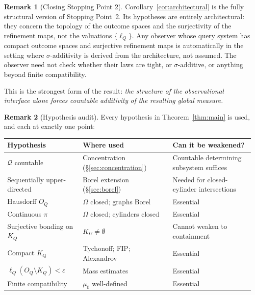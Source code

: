 \documentclass[11pt]{article}
\theoremstyle{definition}
\newtheorem{remark}{Remark}
\newcommand{\Qcal}{\mathcal{Q}}
\begin{document}
\begin{remark}[Closing Stopping Point 2]
Corollary~\ref{cor:architectural} is the fully structural version
of Stopping Point~2.  Its hypotheses are entirely architectural:
they concern the topology of the outcome spaces and the surjectivity
of the refinement maps, not the valuations $\{\ell_Q\}$.  Any
observer whose query system has compact outcome spaces and surjective
refinement maps is automatically in the setting where
$\sigma$-additivity is derived from the architecture, not assumed.
The observer need not check whether their laws are tight, or
$\sigma$-additive, or anything beyond finite compatibility.

This is the strongest form of the result: \emph{the structure of
the observational interface alone forces countable additivity of the
resulting global measure.}
\end{remark}

\begin{remark}[Hypothesis audit]
Every hypothesis in Theorem~\ref{thm:main} is used, and each
at exactly one point:

\begin{center}
\begin{tabular}{lll}
\toprule
Hypothesis & Where used & Can it be weakened? \\
\midrule
$\Qcal$ countable & Concentration (\S\ref{sec:concentration})
  & Countable determining subsystem suffices \\
Sequentially upper-directed & Borel extension (\S\ref{sec:borel})
  & Needed for closed-cylinder intersections \\
Hausdorff $O_Q$ & $\Omega$ closed; graphs Borel
  & Essential \\
Continuous $\pi$ & $\Omega$ closed; cylinders closed
  & Essential \\
Surjective bonding on $K_Q$ & $K_\Omega \neq \emptyset$
  & Cannot weaken to containment \\
Compact $K_Q$ & Tychonoff; FIP; Alexandrov
  & Essential \\
$\ell_Q(O_Q \setminus K_Q) < \varepsilon$ & Mass estimates
  & Essential \\
Finite compatibility & $\mu_0$ well-defined
  & Essential \\
\bottomrule
\end{tabular}
\end{center}
\end{remark}

\end{document}
